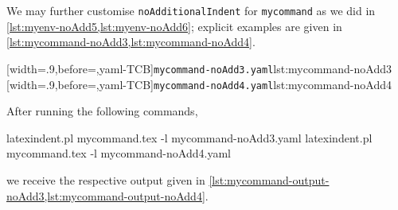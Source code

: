  \begin{example}
 We may further customise \texttt{noAdditionalIndent} for \texttt{mycommand} as we did in
 \vref{lst:myenv-noAdd5,lst:myenv-noAdd6}; explicit examples are given in
 \cref{lst:mycommand-noAdd3,lst:mycommand-noAdd4}.

 \begin{cmhtcbraster}
  [width=.9\linewidth,before=\centering,yaml-TCB]{\texttt{mycommand-noAdd3.yaml}}{lst:mycommand-noAdd3}
  [width=.9\linewidth,before=\centering,yaml-TCB]{\texttt{mycommand-noAdd4.yaml}}{lst:mycommand-noAdd4}
 \end{cmhtcbraster}

 After running the following commands, 

 \begin{commandshell}
latexindent.pl mycommand.tex -l mycommand-noAdd3.yaml  
latexindent.pl mycommand.tex -l mycommand-noAdd4.yaml  
\end{commandshell}

 we receive the respective output given in
 \cref{lst:mycommand-output-noAdd3,lst:mycommand-output-noAdd4}.

 \begin{cmhtcbraster}
 \end{cmhtcbraster}
 \end{example}


